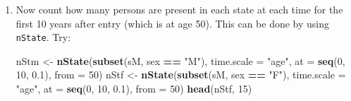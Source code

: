 \documentclass[
]{book}
\newenvironment{Shaded}{\begin{snugshade}}{\end{snugshade}}
\newcommand{\AttributeTok}[1]{\textcolor[rgb]{0.13,0.29,0.53}{#1}}
\newcommand{\DecValTok}[1]{\textcolor[rgb]{0.00,0.00,0.81}{#1}}
\newcommand{\FloatTok}[1]{\textcolor[rgb]{0.00,0.00,0.81}{#1}}
\newcommand{\FunctionTok}[1]{\textcolor[rgb]{0.13,0.29,0.53}{\textbf{#1}}}
\newcommand{\NormalTok}[1]{#1}
\newcommand{\OtherTok}[1]{\textcolor[rgb]{0.56,0.35,0.01}{#1}}
\newcommand{\SpecialCharTok}[1]{\textcolor[rgb]{0.81,0.36,0.00}{\textbf{#1}}}
\newcommand{\StringTok}[1]{\textcolor[rgb]{0.31,0.60,0.02}{#1}}
\begin{document}
\begin{enumerate}
\begin{Shaded}
\begin{Highlighting}[]
\FunctionTok{summary}\NormalTok{(sM, }\AttributeTok{by =} \StringTok{"sex"}\NormalTok{)}
\end{Highlighting}
\end{Shaded}

\begin{Shaded}
\begin{Highlighting}[]
\NormalTok{$M}

\NormalTok{Transitions:}
\NormalTok{     To}
\NormalTok{From  NRA Rem ESRD ESRD(Rem)  Records:  Events: Risk time:  Persons:}
\NormalTok{  NRA  30  72  398         0       500      470       2721       500}
\NormalTok{  Rem   0  35    0        37        72       37        415        72}
\NormalTok{  Sum  30 107  398        37       572      507       3136       500}

\NormalTok{$F}

\NormalTok{Transitions:}
\NormalTok{     To}
\NormalTok{From  NRA Rem ESRD ESRD(Rem)  Records:  Events: Risk time:  Persons:}
\NormalTok{  NRA  32 143  325         0       500      468       2358       500}
\NormalTok{  Rem   0  89    0        54       143       54       1023       143}
\NormalTok{  Sum  32 232  325        54       643      522       3380       500}
\end{Highlighting}
\end{Shaded}

  Why are there so many ESRD-events in the resulting data set?
\item
  Now count how many persons are present in each state
  at each time for the first 10 years after entry (which is at age 50). This
  can be done by using \texttt{nState}. Try:

\begin{Shaded}
\begin{Highlighting}[]
\NormalTok{nStm }\OtherTok{\textless{}{-}} \FunctionTok{nState}\NormalTok{(}\FunctionTok{subset}\NormalTok{(sM, sex }\SpecialCharTok{==} \StringTok{"M"}\NormalTok{), }\AttributeTok{time.scale =} \StringTok{"age"}\NormalTok{, }
               \AttributeTok{at =} \FunctionTok{seq}\NormalTok{(}\DecValTok{0}\NormalTok{, }\DecValTok{10}\NormalTok{, }\FloatTok{0.1}\NormalTok{), }
             \AttributeTok{from =} \DecValTok{50}\NormalTok{)}
\NormalTok{nStf }\OtherTok{\textless{}{-}} \FunctionTok{nState}\NormalTok{(}\FunctionTok{subset}\NormalTok{(sM, sex }\SpecialCharTok{==} \StringTok{"F"}\NormalTok{), }\AttributeTok{time.scale =} \StringTok{"age"}\NormalTok{, }
               \AttributeTok{at =} \FunctionTok{seq}\NormalTok{(}\DecValTok{0}\NormalTok{, }\DecValTok{10}\NormalTok{, }\FloatTok{0.1}\NormalTok{), }
             \AttributeTok{from =} \DecValTok{50}\NormalTok{)}
\FunctionTok{head}\NormalTok{(nStf, }\DecValTok{15}\NormalTok{)}
\end{Highlighting}
\end{Shaded}


\end{enumerate}
\end{document}
